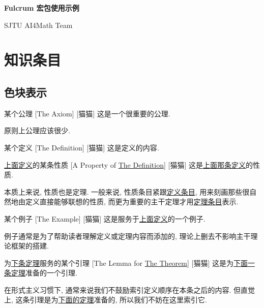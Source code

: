 \documentclass[UTF8]{ctexart}
\begin{document}
    \begin{center}
        {\LARGE\textbf{Fulcrum 宏包使用示例}}

        SJTU AI4Math Team
    \end{center}

    \section{知识条目}

    \subsection{色块表示}
        
        \begin{axm}
            [TheAxiom]
            {某个公理}
            [The Axiom]
            [猫猫]
            这是一个很重要的公理. 

            原则上公理应该很少. 
        \end{axm}
    
        \begin{dfn}
            [TheDefinition]
            {某个定义}
            [The Definition]
            [猫猫]
            这是定义的内容. 
        \end{dfn}
        
        \begin{ppt}
            [TheProperty]
            {\hyperref[dfn:TheDefinition]{上面定义}的某条性质}
            [A Property of \hyperref[dfn:TheDefinition]{The Definition}]
            [猫猫]
            这是\hyperref[dfn:TheDefinition]{上面那条定义}的性质. 

            本质上来说, 性质也是定理. 一般来说, 性质条目紧跟\hyperref[dfn:TheDefinition]{定义条目}, 用来刻画那些很自然地由定义直接能够联想的性质, 而更为重要的主干定理才用\hyperref[thm:TheTheorem]{定理条目}表示. 
        \end{ppt}
        
        \begin{xmp}
            [TheExample]
            {某个例子}
            [The Example]
            [猫猫]
            这是服务于\hyperref[dfn:TheDefinition]{上面定义}的一个例子. 
            
            例子通常是为了帮助读者理解定义或定理内容而添加的, 理论上删去不影响主干理论框架的搭建. 
        \end{xmp}
        
        \begin{lma}
            [TheLemma]
            {为\hyperref[thm:TheTheorem]{下条定理}服务的某个引理}
            [The Lemma for \hyperref[thm:TheTheorem]{The Theorem}]
            [猫猫]
            这是为\hyperref[thm:TheTheorem]{下面一条定理}准备的一个引理. 
            
            在形式主义习惯下, 通常来说我们不鼓励索引定义顺序在本条之后的内容. 但直觉上, 这条引理是为\hyperref[thm:TheTheorem]{下面的定理}准备的, 所以我们不妨在这里索引它. 
        \end{lma}
        
\end{document}
